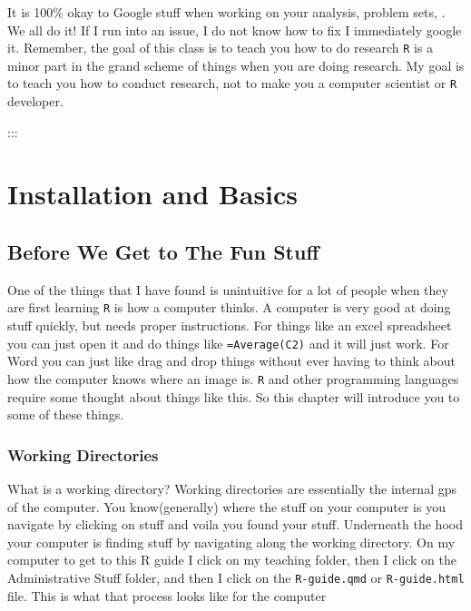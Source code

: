 \documentclass[
  letterpaper,
  DIV=11,
  numbers=noendperiod,
  oneside]{scrreprt}
\begin{document}
It is 100\% okay to Google stuff when working on your analysis, problem
sets, . We all do it! If I run into an issue, I do not know how to fix I
immediately google it. Remember, the goal of this class is to teach you
how to do research \texttt{R} is a minor part in the grand scheme of
things when you are doing research. My goal is to teach you how to
conduct research, not to make you a computer scientist or \texttt{R}
developer.

:::

\part{Installation and Basics}


\hypertarget{before-we-get-to-the-fun-stuff}{%
\chapter{Before We Get to The Fun
Stuff}\label{before-we-get-to-the-fun-stuff}}

One of the things that I have found is unintuitive for a lot of people
when they are first learning \texttt{R} is how a computer thinks. A
computer is very good at doing stuff quickly, but needs proper
instructions. For things like an excel spreadsheet you can just open it
and do things like \texttt{=Average(C2)} and it will just work. For Word
you can just like drag and drop things without ever having to think
about how the computer knows where an image is. \texttt{R} and other
programming languages require some thought about things like this. So
this chapter will introduce you to some of these things.

\hypertarget{working-directories}{%
\section{Working Directories}\label{working-directories}}

What is a working directory? Working directories are essentially the
internal gps of the computer. You know(generally) where the stuff on
your computer is you navigate by clicking on stuff and voila you found
your stuff. Underneath the hood your computer is finding stuff by
navigating along the working directory. On my computer to get to this R
guide I click on my teaching folder, then I click on the Administrative
Stuff folder, and then I click on the \texttt{R-guide.qmd} or
\texttt{R-guide.html} file. This is what that process looks like for the
computer
\end{document}
